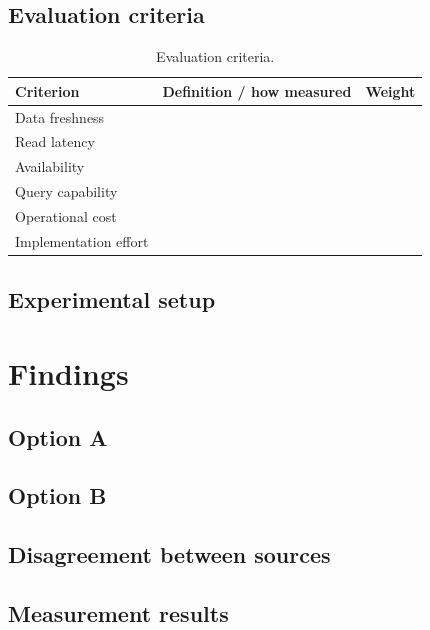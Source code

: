 \documentclass[11pt,a4paper]{article}
\begin{document}
\subsection{Evaluation criteria}

\begin{table}[h]
\centering
\caption{Evaluation criteria.}
\begin{tabular}{@{}lll@{}}
\toprule
Criterion & Definition / how measured & Weight \\
\midrule
Data freshness        & & \\
Read latency          & & \\
Availability          & & \\
Query capability      & & \\
Operational cost      & & \\
Implementation effort & & \\
\bottomrule
\end{tabular}
\end{table}

\subsection{Experimental setup}

\section{Findings}

\subsection{Option A}

\subsection{Option B}

\subsection{Disagreement between sources}

\subsection{Measurement results}
\end{document}
